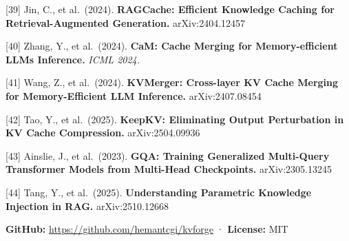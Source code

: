 \documentclass[10pt,twocolumn]{article}
\begin{document}
{[}39{]} Jin, C., et al.~(2024). \textbf{RAGCache: Efficient Knowledge Caching for Retrieval-Augmented Generation.} arXiv:2404.12457

{[}40{]} Zhang, Y., et al.~(2024). \textbf{CaM: Cache Merging for Memory-efficient LLMs Inference.} \emph{ICML 2024.}

{[}41{]} Wang, Z., et al.~(2024). \textbf{KVMerger: Cross-layer KV Cache Merging for Memory-Efficient LLM Inference.} arXiv:2407.08454

{[}42{]} Tao, Y., et al.~(2025). \textbf{KeepKV: Eliminating Output Perturbation in KV Cache Compression.} arXiv:2504.09936

{[}43{]} Ainslie, J., et al.~(2023). \textbf{GQA: Training Generalized Multi-Query Transformer Models from Multi-Head Checkpoints.} arXiv:2305.13245

{[}44{]} Tang, Y., et al.~(2025). \textbf{Understanding Parametric Knowledge Injection in RAG.} arXiv:2510.12668

\textbf{GitHub:} \url{https://github.com/hemantcgi/kvforge} · \textbf{License:} MIT
\end{document}
